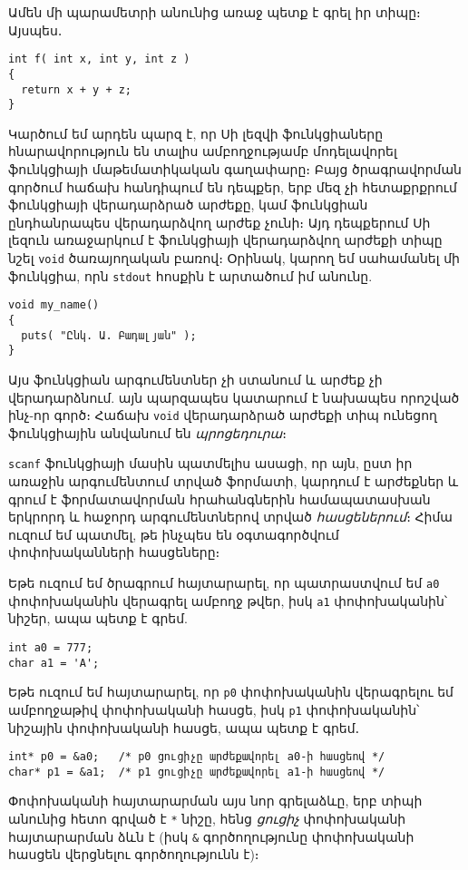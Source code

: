 Ամեն մի պարամետրի անունից առաջ պետք է գրել իր տիպը։ Այսպես․

\begin{verbatim}
int f( int x, int y, int z )
{
  return x + y + z;
}
\end{verbatim}

Կարծում եմ արդեն պարզ է, որ Սի լեզվի ֆունկցիաները հնարավորություն են տալիս
ամբողջությամբ մոդելավորել ֆունկցիայի մաթեմատիկական գաղափարը։ Բայց ծրագրավորման
գործում հաճախ հանդիպում են դեպքեր, երբ մեզ չի հետաքրքրում ֆունկցիայի
վերադարձրած արժեքը, կամ ֆունկցիան ընդհանրապես վերադարձվող արժեք չունի։ Այդ
դեպքերում Սի լեզուն առաջարկում է ֆունկցիայի վերադարձվող արժեքի տիպը նշել
\texttt{void} ծառայողական բառով։ Օրինակ, կարող եմ սահամանել մի ֆունկցիա, որն
\texttt{stdout} հոսքին է արտածում իմ անունը.

\begin{verbatim}
void my_name()
{
  puts( "Ընկ. Ա. Բադալյան" );
}
\end{verbatim}

Այս ֆունկցիան արգումենտներ չի ստանում և արժեք չի վերադարձնում. այն պարզապես
կատարում է նախապես որոշված ինչ-որ գործ։ Հաճախ \texttt{void} վերադարձրած
արժեքի տիպ ունեցող ֆունկցիային անվանում են \emph{պրոցեդուրա}։


\texttt{scanf} ֆունկցիայի մասին պատմելիս ասացի, որ այն, ըստ իր առաջին
արգումենտում տրված ֆորմատի, կարդում է արժեքներ և գրում է ֆորմատավորման
հրահանգներին համապատասխան երկրորդ և հաջորդ արգումենտներով տրված
\emph{հասցեներում}։ Հիմա ուզում եմ պատմել, թե ինչպես են օգտագործվում
փոփոխականների հասցեները։

Եթե ուզում եմ ծրագրում հայտարարել, որ պատրաստվում եմ \texttt{a0} փոփոխականին
վերագրել ամբողջ թվեր, իսկ \texttt{a1} փոփոխականին՝ նիշեր, ապա պետք է գրեմ.

\begin{verbatim}
int a0 = 777;
char a1 = 'A';
\end{verbatim}

Եթե ուզում եմ հայտարարել, որ \texttt{p0} փոփոխականին վերագրելու եմ ամբողջաթիվ
փոփոխականի հասցե, իսկ \texttt{p1} փոփոխականին՝ նիշային փոփոխականի հասցե,
ապա պետք է գրեմ․

\begin{verbatim}
int* p0 = &a0;   /* p0 ցուցիչը արժեքավորել a0-ի հասցեով */
char* p1 = &a1;  /* p1 ցուցիչը արժեքավորել a1-ի հասցեով */
\end{verbatim}

Փոփոխականի հայտարարման այս նոր գրելաձևը, երբ տիպի անունից հետո գրված է
\verb|*| նիշը, հենց \emph{ցուցիչ} փոփոխականի հայտարարման ձևն է (իսկ \verb|&|
գործողությունը փոփոխականի հասցեն վերցնելու գործողությունն է)։

